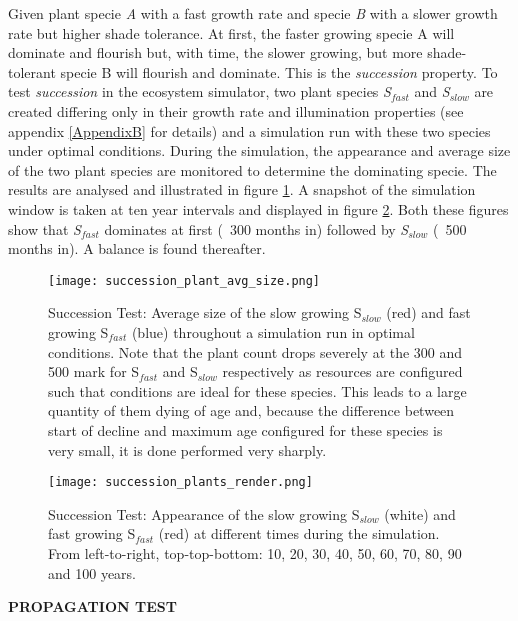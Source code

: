 Given plant specie \textit{A} with a fast growth rate and specie \textit{B} with a slower growth rate but higher shade tolerance. At first, the faster growing specie A will dominate and flourish but, with time, the slower growing, but more shade-tolerant specie B will flourish and dominate. This is the \textit{succession} property. To test \textit{succession} in the ecosystem simulator, two plant species \textit{S$_{fast}$} and \textit{S$_{slow}$} are created differing only in their growth rate and illumination properties (see appendix \ref{AppendixB} for details) and a simulation run with these two species under optimal conditions. During the simulation, the appearance and average size of the two plant species are monitored to determine the dominating specie. The results are analysed and illustrated in figure \ref{fig:succession_plants_avg_size}. A snapshot of the simulation window is taken at ten year intervals and displayed in figure \ref{fig:succession_plants_render}. Both these figures show that \textit{S$_{fast}$} dominates at first (~300 months in) followed by \textit{S$_{slow}$} (~500 months in). A balance is found thereafter.\\

\begin{figure}
\center
	\texttt{[image: succession\_plant\_avg\_size.png]}
	\caption{ Succession Test: Average size of the slow growing S$_{slow}$ (red) and fast growing S$_{fast}$ (blue) throughout a simulation run in optimal conditions. Note that the plant count drops severely at the 300 and 500 mark for S$_{fast}$ and S$_{slow}$ respectively as resources are configured such that conditions are ideal for these species. This leads to a large quantity of them dying of age and, because the difference between start of decline and maximum age configured for these species is very small, it is done performed very sharply.}
	\label{fig:succession_plants_avg_size}
\end{figure}

\begin{figure}
\center
	\texttt{[image: succession\_plants\_render.png]}
	\caption{ Succession Test: Appearance of the slow growing S$_{slow}$ (white) and fast growing S$_{fast}$ (red) at different times during the simulation. From left-to-right, top-top-bottom: 10, 20, 30, 40, 50, 60, 70, 80, 90 and 100 years.}
	\label{fig:succession_plants_render}
\end{figure}

\textbf{PROPAGATION TEST}\\

